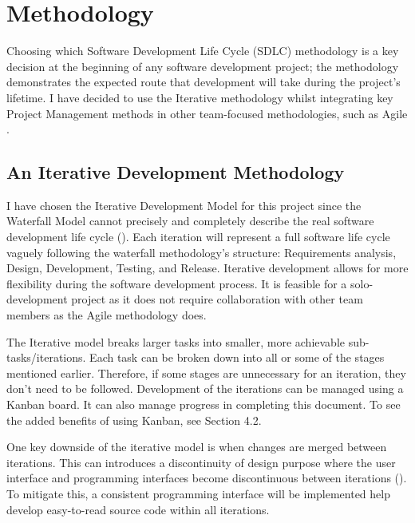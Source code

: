 \chapter{Methodology}
\label{chap:methodology}

Choosing which Software Development Life Cycle (SDLC) methodology is a key decision at the beginning of any software development project; the methodology demonstrates the expected route that development will take during the project's lifetime. I have decided to use the Iterative methodology whilst integrating key Project Management methods in other team-focused methodologies, such as Agile .

\section{An Iterative Development Methodology}
\label{methodology:chosen}

I have chosen the Iterative Development Model for this project since the Waterfall Model cannot precisely and completely describe the real software development life cycle (\cite{dapeng_liu_case_2011}).
Each iteration will represent a full software life cycle vaguely following the waterfall methodology's structure: Requirements analysis, Design, Development, Testing, and Release. Iterative development allows for more flexibility during the software development process. It is feasible for a solo-development project as it does not require collaboration with other team members as the Agile methodology does.

The Iterative model breaks larger tasks into smaller, more achievable sub-tasks/iterations. Each task can be broken down into all or some of the stages mentioned earlier. Therefore, if some stages are unnecessary for an iteration, they don't need to be followed. Development of the iterations can be managed using a Kanban board. It can also manage progress in completing this document. To see the added benefits of using Kanban, see Section 4.2.

One key downside of the iterative model is when changes are merged between iterations. This can introduces a discontinuity of design purpose where the user interface and programming interfaces become discontinuous between iterations (\cite{dapeng_liu_case_2011}). To mitigate this, a consistent programming interface will be implemented help develop easy-to-read source code within all iterations.
